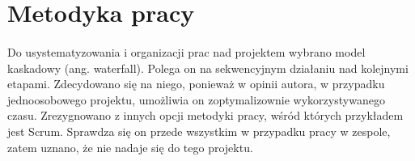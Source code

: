 \section{Metodyka pracy}

\paragraph{}
Do usystematyzowania i organizacji prac nad projektem wybrano model kaskadowy (ang. waterfall). Polega on na sekwencyjnym działaniu nad kolejnymi etapami. Zdecydowano się na niego, ponieważ w opinii autora, w przypadku jednoosobowego projektu, umożliwia on zoptymalizownie wykorzystywanego czasu. Zrezygnowano z innych opcji metodyki pracy, wśród których przykładem jest Scrum. Sprawdza się on przede wszystkim w przypadku pracy w zespole, zatem uznano, że nie nadaje się do tego projektu.
